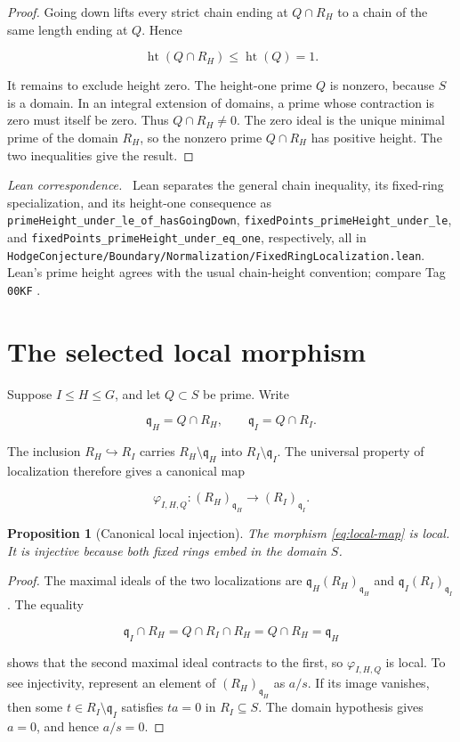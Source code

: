 \documentclass[11pt]{article}
\newtheorem{proposition}[theorem]{Proposition}
\theoremstyle{remark}
\DeclareMathOperator{\htop}{ht}
\newcommand{\q}{\mathfrak q}
\newcommand{\leanpath}[1]{\texttt{\nolinkurl{#1}}}
\newcommand{\leansrc}[1]{%
  \leanpath{HodgeConjecture/Boundary/Normalization/#1}}
\newenvironment{leanfiles}
  {\par\medskip\begingroup\footnotesize\raggedright\noindent
   \textit{Lean correspondence.}\ }
  {\par\endgroup\medskip}
\begin{document}
\begin{proof}
Going down lifts every strict chain ending at \(Q\cap R_H\) to a chain of
the same length ending at \(Q\).  Hence

\[
  \htop(Q\cap R_H)\leq\htop(Q)=1.
\]

It remains to exclude height zero.  The height-one prime \(Q\) is nonzero,
because \(S\) is a domain.  In an integral extension of domains, a prime
whose contraction is zero must itself be zero.  Thus \(Q\cap R_H\neq0\).
The zero ideal is the unique minimal prime of the domain \(R_H\), so the
nonzero prime \(Q\cap R_H\) has positive height.  The two inequalities give
the result.
\end{proof}

\begin{leanfiles}
Lean separates the general chain inequality, its fixed-ring specialization,
and its height-one consequence as
\leanpath{primeHeight_under_le_of_hasGoingDown},
\leanpath{fixedPoints_primeHeight_under_le}, and
\leanpath{fixedPoints_primeHeight_under_eq_one}, respectively, all in
\leansrc{FixedRingLocalization.lean}.  Lean's prime height agrees with the
usual chain-height convention; compare Tag \texttt{00KF}
\cite{StacksPrimeHeight}.
\end{leanfiles}

\section{The selected local morphism}
\label{sec:local-map}

Suppose \(I\leq H\leq G\), and let \(Q\subset S\) be prime.  Write

\[
  \q_H=Q\cap R_H,
  \qquad
  \q_I=Q\cap R_I.
\]

The inclusion \(R_H\hookrightarrow R_I\) carries
\(R_H\setminus \q_H\) into \(R_I\setminus \q_I\).  The universal property of
localization therefore gives a canonical map

\begin{equation}
\label{eq:local-map}
  \varphi_{I,H,Q}\colon
  (R_H)_{\q_H}\longrightarrow(R_I)_{\q_I}.
\end{equation}

\begin{proposition}[Canonical local injection]
\label{prop:local-injection}
The morphism \eqref{eq:local-map} is local.  It is injective because both
fixed rings embed in the domain \(S\).
\end{proposition}

\begin{proof}
The maximal ideals of the two localizations are \(\q_H(R_H)_{\q_H}\) and
\(\q_I(R_I)_{\q_I}\).  The equality

\[
  \q_I\cap R_H=Q\cap R_I\cap R_H=Q\cap R_H=\q_H
\]

shows that the second maximal ideal contracts to the first, so
\(\varphi_{I,H,Q}\) is local.  To see injectivity, represent an element of
\((R_H)_{\q_H}\) as \(a/s\).  If its image vanishes, then some
\(t\in R_I\setminus \q_I\) satisfies \(ta=0\) in \(R_I\subseteq S\).
The domain hypothesis gives \(a=0\), and hence \(a/s=0\).
\end{proof}
\end{document}
